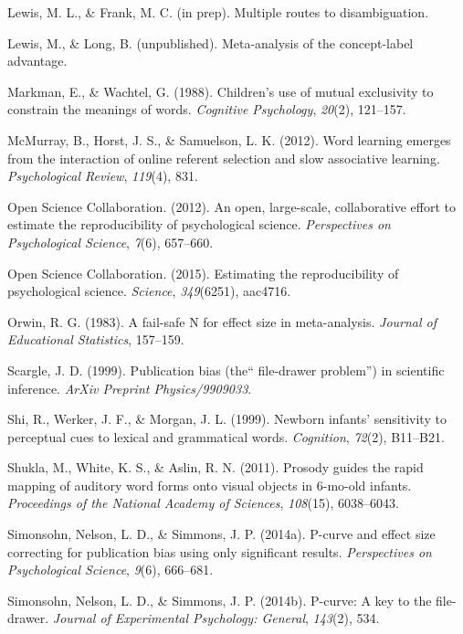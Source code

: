 \documentclass[english,floatsintext,man]{apa6}
\begin{document}
\hypertarget{ref-lfprep}{}
Lewis, M. L., \& Frank, M. C. (in prep). Multiple routes to
disambiguation.

\hypertarget{ref-lewisunpublished}{}
Lewis, M., \& Long, B. (unpublished). Meta-analysis of the concept-label
advantage.

\hypertarget{ref-markman1988}{}
Markman, E., \& Wachtel, G. (1988). Children's use of mutual exclusivity
to constrain the meanings of words. \emph{Cognitive Psychology},
\emph{20}(2), 121--157.

\hypertarget{ref-mcmurray2012word}{}
McMurray, B., Horst, J. S., \& Samuelson, L. K. (2012). Word learning
emerges from the interaction of online referent selection and slow
associative learning. \emph{Psychological Review}, \emph{119}(4), 831.

\hypertarget{ref-open2012open}{}
Open Science Collaboration. (2012). An open, large-scale, collaborative
effort to estimate the reproducibility of psychological science.
\emph{Perspectives on Psychological Science}, \emph{7}(6), 657--660.

\hypertarget{ref-open2015estimating}{}
Open Science Collaboration. (2015). Estimating the reproducibility of
psychological science. \emph{Science}, \emph{349}(6251), aac4716.

\hypertarget{ref-orwin1983fail}{}
Orwin, R. G. (1983). A fail-safe N for effect size in meta-analysis.
\emph{Journal of Educational Statistics}, 157--159.

\hypertarget{ref-scargle1999publication}{}
Scargle, J. D. (1999). Publication bias (the`` file-drawer problem'') in
scientific inference. \emph{ArXiv Preprint Physics/9909033}.

\hypertarget{ref-shi1999newborn}{}
Shi, R., Werker, J. F., \& Morgan, J. L. (1999). Newborn infants'
sensitivity to perceptual cues to lexical and grammatical words.
\emph{Cognition}, \emph{72}(2), B11--B21.

\hypertarget{ref-shukla2011prosody}{}
Shukla, M., White, K. S., \& Aslin, R. N. (2011). Prosody guides the
rapid mapping of auditory word forms onto visual objects in 6-mo-old
infants. \emph{Proceedings of the National Academy of Sciences},
\emph{108}(15), 6038--6043.

\hypertarget{ref-simonsohn2014power}{}
Simonsohn, Nelson, L. D., \& Simmons, J. P. (2014a). P-curve and effect
size correcting for publication bias using only significant results.
\emph{Perspectives on Psychological Science}, \emph{9}(6), 666--681.

\hypertarget{ref-simonsohn2014p}{}
Simonsohn, Nelson, L. D., \& Simmons, J. P. (2014b). P-curve: A key to
the file-drawer. \emph{Journal of Experimental Psychology: General},
\emph{143}(2), 534.
\end{document}
